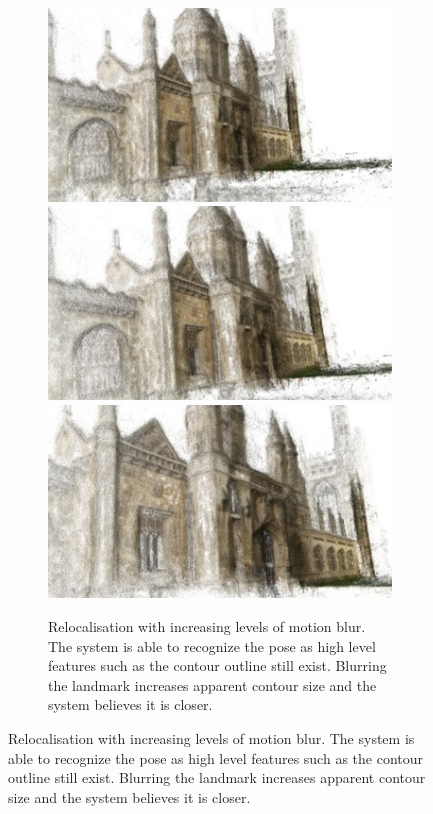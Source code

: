 \begin{figure}[p]
\begin{center}
\begin{subfigure}[b]{\textwidth}
{   	\includegraphics[width=0.16\linewidth]{ICCV/king_seq7_frame00010_blur25pngscreenshot}
   	\includegraphics[width=0.16\linewidth]{ICCV/king_seq7_frame00010_blur50pngscreenshot}
   	\includegraphics[width=0.16\linewidth]{ICCV/king_seq7_frame00010_blur100pngscreenshot}
   	}
   \caption{Relocalisation with increasing levels of motion blur. The system is able to recognize the pose as high level features such as the contour outline still exist. Blurring the landmark increases apparent contour size and the system believes it is closer. }
\end{subfigure}


\end{center}
\end{figure}
